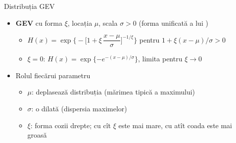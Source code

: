 \begin{frame}{Distribuția GEV}
\itemsize{\small}
\begin{itemize}
    \item \textbf{GEV} cu forma $\xi$, locația $\mu$, scala $\sigma > 0$ (forma unificată a lui )
    \begin{itemize}
        \item $H(x) = \exp\Big\{-\Big[1 + \xi\,\dfrac{x - \mu}{\sigma}\Big]^{-1/\xi}\Big\}$ pentru $1 + \xi(x - \mu)/\sigma > 0$
        \item $\xi = 0$: $H(x) = \exp\{-e^{-(x - \mu)/\sigma}\}$, limita pentru $\xi \to 0$
    \end{itemize}
    \item Rolul fiecărui parametru
    \begin{itemize}
        \item $\mu$: deplasează distribuția (mărimea tipică a maximului)
        \item $\sigma$: o dilată (dispersia maximelor)
        \item $\xi$: forma cozii drepte; cu cît $\xi$ este mai mare, cu atît coada este mai groasă
    \end{itemize}
\end{itemize}
\end{frame}

